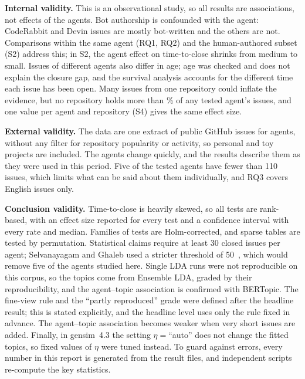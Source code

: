 \textbf{Internal validity.} This is an observational study, so all results are associations, not effects of the agents. Bot authorship is confounded with the agent: CodeRabbit and Devin issues are mostly bot-written and the others are not. Comparisons within the same agent (RQ1, RQ2) and the human-authored subset (S2) address this; in S2, the agent effect on time-to-close shrinks from medium to small. Issues of different agents also differ in age; age was checked and does not explain the closure gap, and the survival analysis accounts for the different time each issue has been open. Many issues from one repository could inflate the evidence, but no repository holds more than \TopRepoMax\% of any tested agent's issues, and one value per agent and repository (S4) gives the same effect size.

\textbf{External validity.} The data are one extract of public GitHub issues for \NAgents{} agents, without any filter for repository popularity or activity, so personal and toy projects are included. The agents change quickly, and the results describe them as they were used in this period. Five of the tested agents have fewer than 110 issues, which limits what can be said about them individually, and RQ3 covers English issues only.

\textbf{Conclusion validity.} Time-to-close is heavily skewed, so all tests are rank-based, with an effect size reported for every test and a confidence interval with every rate and median. Families of tests are Holm-corrected, and sparse tables are tested by permutation. Statistical claims require at least 30 closed issues per agent; Selvanayagam and Ghaleb used a stricter threshold of 50~\cite{selvanayagam2026aitoai}, which would remove five of the agents studied here. Single LDA runs were not reproducible on this corpus, so the topics come from Ensemble LDA, graded by their reproducibility, and the agent--topic association is confirmed with BERTopic. The fine-view rule and the ``partly reproduced'' grade were defined after the headline result; this is stated explicitly, and the headline level uses only the rule fixed in advance. The agent--topic association becomes weaker when very short issues are added. Finally, in gensim~4.3 the setting \(\eta = \)``auto'' does not change the fitted topics, so fixed values of \(\eta\) were tuned instead. To guard against errors, every number in this report is generated from the result files, and independent scripts re-compute the key statistics.
